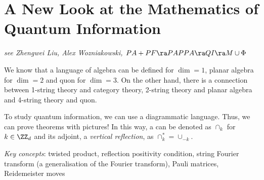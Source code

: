 \documentclass[11pt]{scrartcl}
\begin{document}
\section{A New Look at the Mathematics of Quantum Information}

\textit{see Zhengwei Liu, Alex Wozniakowski, $PA+PF \ra PAPPA \ra QI \ra M\cup \Phi$}

We know that a language of algebra can be defined for $\dim = 1$,
planar algebra for $\dim = 2$ and quon for $\dim = 3$. On the other
hand, there is a connection between 1-string theory and category
theory, 2-string theory and planar algebra and 4-string theory and
quon.

To study quantum information, we can use a diagrammatic
language. Thus, we can prove theorems with pictures! In this way, a
 can be denoted as $\cap_k$ for $k\in \ZZ_d$ and its
adjoint, a \textit{vertical reflection}, as $\cap_k^{*} = \cup_{-k}$.

\textit{Key concepts}: twisted product, reflection positivity
condition, string Fourier transform (a generalisation of the Fourier
transform), Pauli matrices, Reidemeister moves
\end{document}
